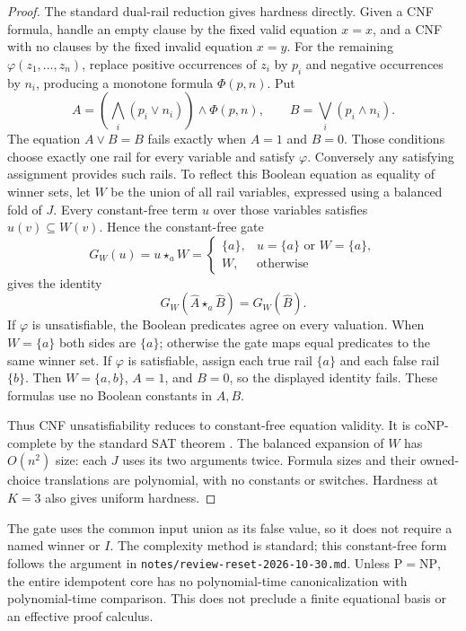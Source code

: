 \documentclass[11pt]{article}
\newcommand{\ow}[1]{\mathbin{\star_{#1}}}
\begin{document}
\begin{proof}
The standard dual-rail reduction gives hardness directly. Given a CNF
formula, handle an empty clause by the fixed valid equation $x=x$,
and a CNF with no clauses by the fixed invalid equation $x=y$.
For the remaining $\varphi(z_1,\ldots,z_n)$, replace positive occurrences
of $z_i$ by $p_i$ and negative occurrences by $n_i$, producing a monotone
formula $\Phi(p,n)$. Put
\[
 A=\left(\bigwedge_i(p_i\lor n_i)\right)\land\Phi(p,n),
 \qquad B=\bigvee_i(p_i\land n_i).
\]
The equation $A\lor B=B$ fails exactly when $A=1$ and $B=0$.
Those conditions choose exactly one rail for every variable and satisfy
$\varphi$. Conversely any satisfying assignment provides such rails.
To reflect this Boolean equation as equality of winner sets, let $W$
be the union of all rail variables, expressed using a balanced fold of
$J$. Every constant-free term $u$ over those variables satisfies
$u(v)\subseteq W(v)$. Hence the constant-free gate
\[
 G_W(u)=u\ow a W
 =\begin{cases}
 \{a\},&u=\{a\}\text{ or }W=\{a\},\\
 W,&\text{otherwise}
 \end{cases}
\]
gives the identity
\[
 G_W(\widehat A\ow a\widehat B)=G_W(\widehat B).
\]
If $\varphi$ is unsatisfiable, the Boolean predicates agree on every
valuation. When $W=\{a\}$ both sides are $\{a\}$; otherwise the gate
maps equal predicates to the same winner set. If $\varphi$ is satisfiable,
assign each true rail $\{a\}$ and each false rail $\{b\}$.
Then $W=\{a,b\}$, $A=1$, and $B=0$, so the displayed identity fails.
These formulas use no Boolean constants in $A,B$.

Thus CNF unsatisfiability reduces to constant-free equation validity.
It is coNP-complete by the standard SAT theorem \cite{Cook1971}.
The balanced expansion of $W$ has $O(n^2)$ size: each $J$ uses its two
arguments twice. Formula sizes and their owned-choice translations are
polynomial, with no constants or switches. Hardness at $K=3$ also gives
uniform hardness.
\end{proof}

The gate uses the common input union as its false value, so it does not
require a named winner or $I$. The complexity method is standard; this
constant-free form follows the argument in
\texttt{notes/review-reset-2026-10-30.md}. Unless $\mathrm P=\mathrm{NP}$,
the entire idempotent core has no polynomial-time canonicalization with
polynomial-time comparison. This does not preclude a finite equational
basis or an effective proof calculus.
\end{document}
